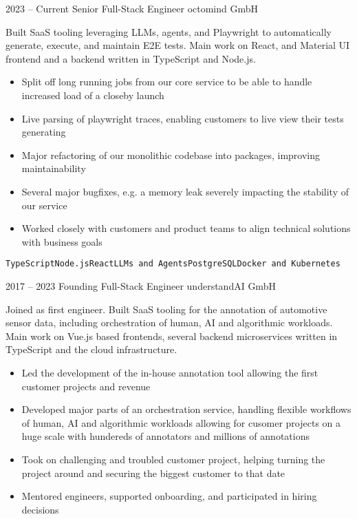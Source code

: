\documentclass[8pt]{developercv} %
\newcommand{\linebreaksmall}{\vspace{2mm}}
\begin{document}
\begin{entrylist}
	\entry
		{2023 -- Current}
		{Senior Full-Stack Engineer}
		{octomind GmbH}
		{Built SaaS tooling leveraging LLMs, agents, and Playwright to automatically generate, execute, and maintain E2E tests. Main work on React, and Material UI frontend and a backend written in TypeScript and Node.js.
		\begin{itemize}[nosep, topsep=0pt, left=5pt, after=\vspace{6pt}]
			\item Split off long running jobs from our core service to be able to handle increased load of a closeby launch
			\item Live parsing of playwright traces, enabling customers to live view their tests generating
			\item Major refactoring of our monolithic codebase into packages, improving maintainability
			\item Several major bugfixes, e.g. a memory leak severely impacting the stability of our service
			\item Worked closely with customers and product teams to align technical solutions with business goals
		\end{itemize}
		\texttt{TypeScript}\slashsep\texttt{Node.js}\slashsep\texttt{React}\slashsep\texttt{LLMs and Agents}\slashsep\texttt{PostgreSQL}\slashsep\texttt{Docker and Kubernetes}} \linebreaksmall
	\entry
		{2017 -- 2023}
		{Founding Full-Stack Engineer}
		{understandAI GmbH}
		{Joined as first engineer. Built SaaS tooling for the annotation of automotive sensor data, including orchestration of human, AI and algorithmic workloads. Main work on Vue.js based frontends, several backend microservices written in TypeScript and the cloud infrastructure.
		\begin{itemize}[nosep, topsep=0pt, left=5pt, after=\vspace{6pt}]
			\item Led the development of the in-house annotation tool allowing the first customer projects and revenue
			\item Developed major parts of an orchestration service, handling flexible workflows of human, AI and algorithmic workloads allowing for cusomer projects on a huge scale with hundereds of annotators and millions of annotations
			\item Took on challenging and troubled customer project, helping turning the project around and securing the biggest customer to that date
			\item Mentored engineers, supported onboarding, and participated in hiring decisions

\end{itemize}}
\end{entrylist}
\end{document}
